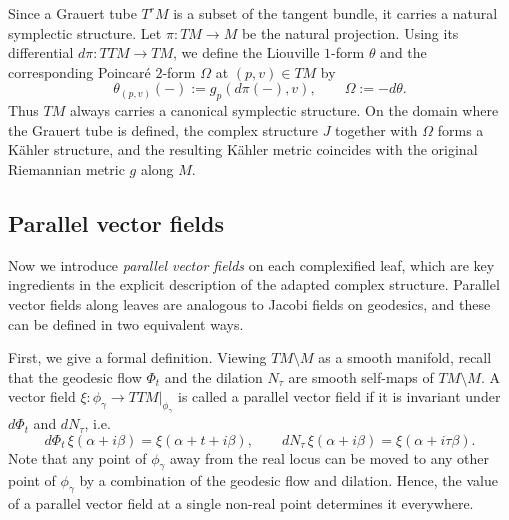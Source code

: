 \documentclass[a4paper, 12pt]{article}
\newcommand{\idd}{i\partial\bar\partial}
\begin{document}
Since a Grauert tube $T^rM$ is a subset of the tangent bundle, it carries a natural symplectic structure. Let $\pi:TM\to M$ be the natural projection. Using its differential $d\pi:TTM\to TM$, we define the Liouville $1$-form $\theta$ and the corresponding Poincar\'e $2$-form $\Omega$ at $(p,v)\in TM$ by
\[
\theta_{(p,v)}(-):=g_p(d\pi(-),v), \qquad \Omega:=-d\theta.
\]
Thus $TM$ always carries a canonical symplectic structure. On the domain where the Grauert tube is defined, the complex structure $J$ together with $\Omega$ forms a Kähler structure, and the resulting Kähler metric coincides with the original Riemannian metric $g$ along $M$.



\subsection{Parallel vector fields}
Now we introduce \emph{parallel vector fields} on each complexified leaf, which are key ingredients in the explicit description of the adapted complex structure. Parallel vector fields along leaves are analogous to Jacobi fields on geodesics, and these can be defined in two equivalent ways.

First, we give a formal definition. Viewing $TM\setminus M$ as a smooth manifold, recall that the geodesic flow $\Phi_t$ and the dilation $N_\tau$ are smooth self-maps of $TM\setminus M$. A vector field $\xi:\phi_\gamma\to TTM|_{\phi_\gamma}$ is called a parallel vector field if it is invariant under $d\Phi_t$ and $dN_\tau$, i.e.
\[
d\Phi_t\,\xi(\alpha+i\beta)=\xi(\alpha+t+i\beta),\qquad
dN_\tau\,\xi(\alpha+i\beta)=\xi(\alpha+i\tau\beta).
\]
Note that any point of $\phi_\gamma$ away from the real locus can be moved to any other point of $\phi_\gamma$ by a combination of the geodesic flow and dilation. Hence, the value of a parallel vector field at a single non-real point determines it everywhere.
\end{document}
